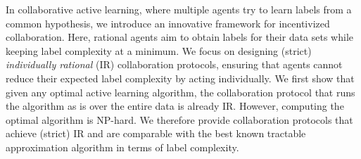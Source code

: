 In collaborative active learning, where multiple agents try to learn labels from a common hypothesis, we introduce an innovative framework for incentivized collaboration. Here, rational agents aim to obtain labels for their data sets while keeping label complexity at a minimum. We focus on designing (strict) \emph{individually rational} (IR) collaboration protocols, ensuring that agents cannot reduce their expected label complexity by acting individually. We first show that given any optimal active learning algorithm, the collaboration protocol that runs the algorithm as is over the entire data is already IR. However, computing the optimal algorithm is NP-hard. We therefore provide collaboration protocols that achieve (strict) IR and are comparable with the best known tractable approximation algorithm in terms of label complexity. 

 